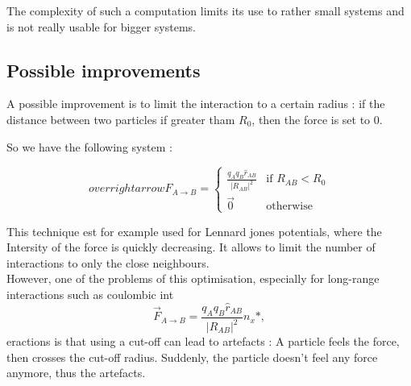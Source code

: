 \documentclass[12pt,twoside,a4paper]{report}
\begin{document}
The complexity of such a computation limits its use to rather small systems and is not really usable for bigger systems.

\subsection{Possible improvements}

A possible improvement is to limit the interaction to a certain radius : if the distance between two particles if greater tham $R_0$, then the force is set to $0$.

So we have the following system :


\begin{equation}
  overrightarrow{F}_{A \rightarrow B}  =
	\begin{cases}
	  \frac{q_A q_B \hat{r}_{AB} }{|R_{AB}|^2}  & \text{if } R_{AB} < R_0 \\
	  \overrightarrow{0} & \text{otherwise}
	\end{cases}
\end{equation}

This technique est for example used for Lennard jones potentials, where the Intersity of the force is quickly decreasing. It allows to limit the number of interactions to only the close neighbours.\\

However, one of the problems of this optimisation, especially for long-range interactions such as coulombic int\begin{equation}
	\overrightarrow{F}_{A \rightarrow B} = \frac{q_A q_B \hat{r}_{AB} }{|R_{AB}|^2}
	\label{coulombSimplified}n_x*,
\end{equation}eractions is that using a cut-off can lead to artefacts : A particle feels the force, then crosses the cut-off radius. Suddenly, the particle doesn't feel any force anymore, thus the artefacts.
\end{document}
